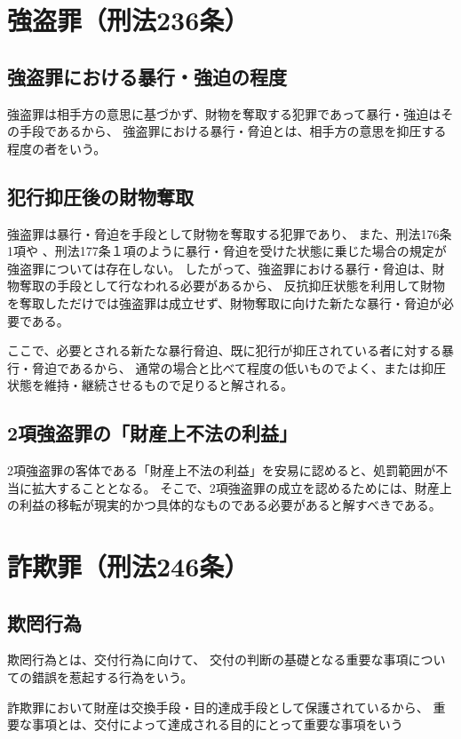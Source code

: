 \documentclass[11pt]{jsarticle}
\begin{document}
	\section{強盗罪（刑法236条）}
		\subsection{強盗罪における暴行・強迫の程度}
			強盗罪は相手方の意思に基づかず、財物を奪取する犯罪であって暴行・強迫はその手段であるから、
			強盗罪における暴行・脅迫とは、相手方の意思を抑圧する程度の者をいう。
		
		\subsection{犯行抑圧後の財物奪取}
			強盗罪は暴行・脅迫を手段として財物を奪取する犯罪であり、
			また、刑法176条1項や	、刑法177条１項のように暴行・脅迫を受けた状態に乗じた場合の規定が強盗罪については存在しない。
			したがって、強盗罪における暴行・脅迫は、財物奪取の手段として行なわれる必要があるから、
			反抗抑圧状態を利用して財物を奪取しただけでは強盗罪は成立せず、財物奪取に向けた新たな暴行・脅迫が必要である。
			
			ここで、必要とされる新たな暴行脅迫、既に犯行が抑圧されている者に対する暴行・脅迫であるから、
			通常の場合と比べて程度の低いものでよく、または抑圧状態を維持・継続させるもので足りると解される。
			
		\subsection{2項強盗罪の「財産上不法の利益」}
			2項強盗罪の客体である「財産上不法の利益」を安易に認めると、処罰範囲が不当に拡大することとなる。
			そこで、2項強盗罪の成立を認めるためには、財産上の利益の移転が現実的かつ具体的なものである必要があると解すべきである。
		
		
	
			
	\section{詐欺罪（刑法246条）}
		\subsection{欺罔行為}
			欺罔行為とは、交付行為に向けて、
			交付の判断の基礎となる重要な事項についての錯誤を惹起する行為をいう。
			
			詐欺罪において財産は交換手段・目的達成手段として保護されているから、
			重要な事項とは、交付によって達成される目的にとって重要な事項をいう
		
\end{document}
